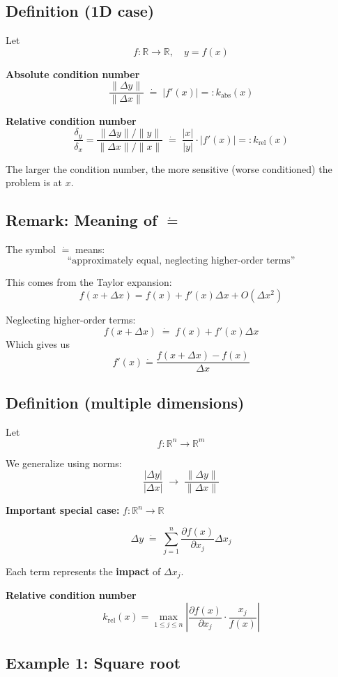 \documentclass{article}
\begin{document}
\subsection{Definition (1D case)}

Let
\[
f: \mathbb{R} \to \mathbb{R}, \quad y = f(x)
\]

\textbf{Absolute condition number}
\[
\frac{\|\Delta y\|}{\|\Delta x\|} \;\dot{=}\; |f'(x)| =: k_{\text{abs}}(x)
\]

\textbf{Relative condition number}
\[
\frac{\delta_y}{\delta_x}
=
\frac{\|\Delta y\|/\|y\|}{\|\Delta x\|/\|x\|}
\;\dot{=}\;
\frac{|x|}{|y|} \cdot |f'(x)|
=:
k_{\text{rel}}(x)
\]

The larger the condition number, the more sensitive (worse conditioned) the problem is at $x$.

\subsection{Remark: Meaning of $\dot{=}$}

The symbol $\dot{=}$ means:
\[
\text{``approximately equal, neglecting higher-order terms''}
\]

This comes from the Taylor expansion:
\[
f(x + \Delta x) = f(x) + f'(x)\Delta x + O(\Delta x^2)
\]

Neglecting higher-order terms:
\[
f(x + \Delta x) \;\dot{=}\; f(x) + f'(x)\Delta x
\]
Which gives us 
\[f'(x) \dot{=} \frac{f(x+\Delta x) - f(x)}{\Delta x}\]

\subsection{Definition (multiple dimensions)}

Let
\[
f: \mathbb{R}^n \to \mathbb{R}^m
\]

We generalize using norms:
\[
\frac{|\Delta y|}{|\Delta x|}
\;\to\;
\frac{\|\Delta y\|}{\|\Delta x\|}
\]

\textbf{Important special case:} $f: \mathbb{R}^n \to \mathbb{R}$

\[
\Delta y \;\dot{=}\; \sum_{j=1}^{n} \frac{\partial f(x)}{\partial x_j} \Delta x_j
\]

Each term represents the \textbf{impact} of $\Delta x_j$.

\textbf{Relative condition number}
\[
k_{\text{rel}}(x)
=
\max_{1 \le j \le n}
\left|
\frac{\partial f(x)}{\partial x_j}
\cdot
\frac{x_j}{f(x)}
\right|
\]

\subsection{Example 1: Square root}
\end{document}
